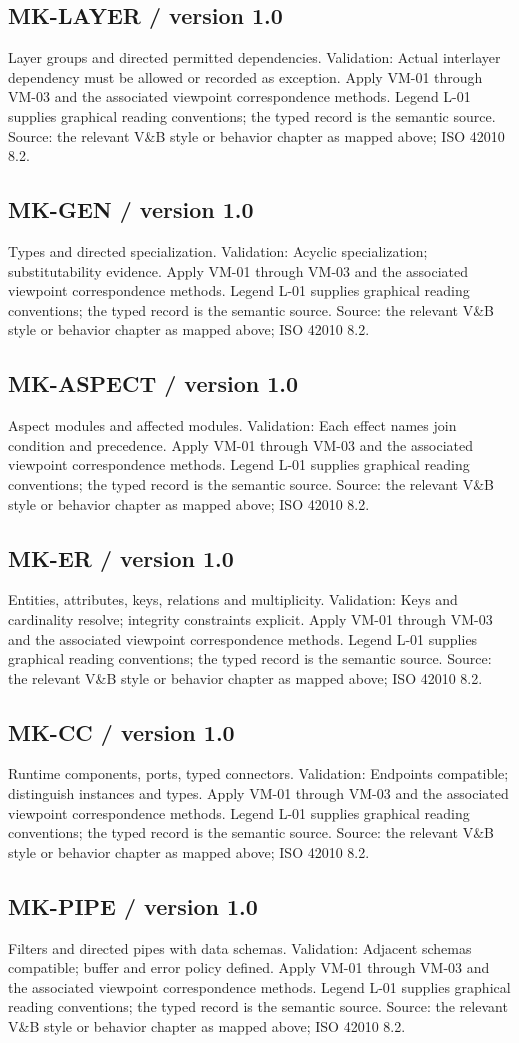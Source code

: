 \documentclass[11pt,letterpaper]{article}
\newcommand{\docsub}[1]{\Needspace{4\baselineskip}\subsection{#1}}
\begin{document}
\docsub{MK-LAYER / version 1.0}
Layer groups and directed permitted dependencies. Validation: Actual interlayer dependency must be allowed or recorded as exception. Apply VM-01 through VM-03 and the associated viewpoint correspondence methods. Legend L-01 supplies graphical reading conventions; the typed record is the semantic source. Source: the relevant V\&B style or behavior chapter as mapped above; ISO 42010 8.2.

\docsub{MK-GEN / version 1.0}
Types and directed specialization. Validation: Acyclic specialization; substitutability evidence. Apply VM-01 through VM-03 and the associated viewpoint correspondence methods. Legend L-01 supplies graphical reading conventions; the typed record is the semantic source. Source: the relevant V\&B style or behavior chapter as mapped above; ISO 42010 8.2.

\docsub{MK-ASPECT / version 1.0}
Aspect modules and affected modules. Validation: Each effect names join condition and precedence. Apply VM-01 through VM-03 and the associated viewpoint correspondence methods. Legend L-01 supplies graphical reading conventions; the typed record is the semantic source. Source: the relevant V\&B style or behavior chapter as mapped above; ISO 42010 8.2.

\docsub{MK-ER / version 1.0}
Entities, attributes, keys, relations and multiplicity. Validation: Keys and cardinality resolve; integrity constraints explicit. Apply VM-01 through VM-03 and the associated viewpoint correspondence methods. Legend L-01 supplies graphical reading conventions; the typed record is the semantic source. Source: the relevant V\&B style or behavior chapter as mapped above; ISO 42010 8.2.

\docsub{MK-CC / version 1.0}
Runtime components, ports, typed connectors. Validation: Endpoints compatible; distinguish instances and types. Apply VM-01 through VM-03 and the associated viewpoint correspondence methods. Legend L-01 supplies graphical reading conventions; the typed record is the semantic source. Source: the relevant V\&B style or behavior chapter as mapped above; ISO 42010 8.2.

\docsub{MK-PIPE / version 1.0}
Filters and directed pipes with data schemas. Validation: Adjacent schemas compatible; buffer and error policy defined. Apply VM-01 through VM-03 and the associated viewpoint correspondence methods. Legend L-01 supplies graphical reading conventions; the typed record is the semantic source. Source: the relevant V\&B style or behavior chapter as mapped above; ISO 42010 8.2.
\end{document}
